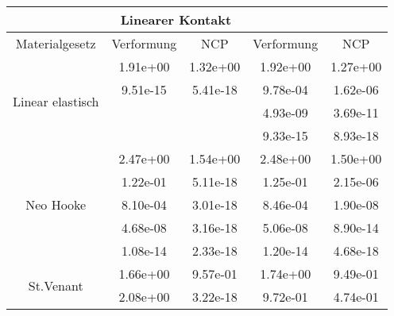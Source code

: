 \begin{table} 
\centering 
\begin{tabular}{c|cc|cc|} 
\cline{2-5} 
 & \multicolumn{2}{|c|}{Linearer Kontakt} &  \\ 
\hline 
\multicolumn{1}{|c|}{Materialgesetz} & \multicolumn{1}{c|}{Verformung} & \multicolumn{1}{c|}{NCP} & \multicolumn{1}{c|}{Verformung} & \multicolumn{1}{c|}{NCP} \\ 
\hline 
\multicolumn{1}{|c|}{\multirow{4}{*}{Linear elastisch}} &\multicolumn{1}{|c|}{  1.91e+00} & \multicolumn{1}{|c|}{  1.32e+00} & \multicolumn{1}{|c|}{  1.92e+00} & \multicolumn{1}{|c|}{  1.27e+00} \\ 
\multicolumn{1}{|c|}{} & \multicolumn{1}{|c|}{  9.51e-15} & \multicolumn{1}{|c|}{  5.41e-18} & \multicolumn{1}{|c|}{  9.78e-04} & \multicolumn{1}{|c|}{  1.62e-06} \\ 
\multicolumn{1}{|c|}{} & \multicolumn{1}{|c|}{} & \multicolumn{1}{|c|}{} & \multicolumn{1}{|c|}{  4.93e-09} & \multicolumn{1}{|c|}{  3.69e-11} \\ 
\multicolumn{1}{|c|}{} & \multicolumn{1}{|c|}{} & \multicolumn{1}{|c|}{} & \multicolumn{1}{|c|}{  9.33e-15} & \multicolumn{1}{|c|}{  8.93e-18} \\ 
\hline 
\multicolumn{1}{|c|}{\multirow{5}{*}{Neo Hooke}} &\multicolumn{1}{|c|}{  2.47e+00} & \multicolumn{1}{|c|}{  1.54e+00} & \multicolumn{1}{|c|}{  2.48e+00} & \multicolumn{1}{|c|}{  1.50e+00} \\ 
\multicolumn{1}{|c|}{} & \multicolumn{1}{|c|}{  1.22e-01} & \multicolumn{1}{|c|}{  5.11e-18} & \multicolumn{1}{|c|}{  1.25e-01} & \multicolumn{1}{|c|}{  2.15e-06} \\ 
\multicolumn{1}{|c|}{} & \multicolumn{1}{|c|}{  8.10e-04} & \multicolumn{1}{|c|}{  3.01e-18} & \multicolumn{1}{|c|}{  8.46e-04} & \multicolumn{1}{|c|}{  1.90e-08} \\ 
\multicolumn{1}{|c|}{} & \multicolumn{1}{|c|}{  4.68e-08} & \multicolumn{1}{|c|}{  3.16e-18} & \multicolumn{1}{|c|}{  5.06e-08} & \multicolumn{1}{|c|}{  8.90e-14} \\ 
\multicolumn{1}{|c|}{} & \multicolumn{1}{|c|}{  1.08e-14} & \multicolumn{1}{|c|}{  2.33e-18} & \multicolumn{1}{|c|}{  1.20e-14} & \multicolumn{1}{|c|}{  4.68e-18} \\ 
\hline 
\multicolumn{1}{|c|}{\multirow{101}{*}{St.Venant}} &\multicolumn{1}{|c|}{  1.66e+00} & \multicolumn{1}{|c|}{  9.57e-01} & \multicolumn{1}{|c|}{  1.74e+00} & \multicolumn{1}{|c|}{  9.49e-01} \\ 
\multicolumn{1}{|c|}{} & \multicolumn{1}{|c|}{  2.08e+00} & \multicolumn{1}{|c|}{  3.22e-18} & \multicolumn{1}{|c|}{  9.72e-01} & \multicolumn{1}{|c|}{  4.74e-01} \\ 

\end{tabular}
\end{table}
